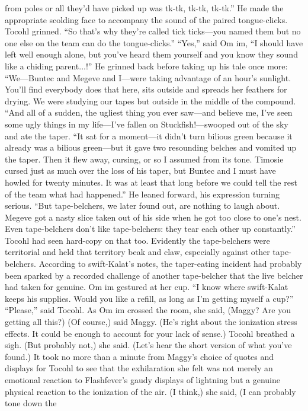 \documentclass[9pt]{article}
\begin{document}
from poles or all they’d have picked up was tk-tk, tk-tk, tk-tk.” He made the appropriate scolding face
to accompany the sound of the paired tongue-clicks.
Tocohl grinned. “So that’s why they’re called tick ticks—you named them but no one else on the
team can do the tongue-clicks.”
“Yes,” said Om im, “I should have left well enough alone, but you’ve heard them yourself and you
know they sound like a chiding parent...!”
He grinned back before taking up his tale once more: “We—Buntec and Megeve and I—were
taking advantage of an hour’s sunlight. You’ll find everybody does that here, sits outside and spreads her
feathers for drying. We were studying our tapes but outside in the middle of the compound.
“And all of a sudden, the ugliest thing you ever saw—and believe me, I’ve seen some ugly things in
my life—I’ve fallen on Stuckfish!—swooped out of the sky and ate the taper.
“It sat for a moment—it didn’t turn bilious green because it already was a bilious green—but it gave
two resounding belches and vomited up the taper. Then it flew away, cursing, or so I assumed from its
tone. Timosie cursed just as much over the loss of his taper, but Buntec and I must have howled for
twenty minutes. It was at least that long before we could tell the rest of the team what had happened.”
He leaned forward, his expression turning serious. “But tape-belchers, we later found out, are nothing
to laugh about. Megeve got a nasty slice taken out of his side when he got too close to one’s nest. Even
tape-belchers don’t like tape-belchers: they tear each other up constantly.”
Tocohl had seen hard-copy on that too. Evidently the tape-belchers were territorial and held that
territory beak and claw, especially against other tape-belchers. According to swift-Kalat’s notes, the
taper-eating incident had probably been sparked by a recorded challenge of another tape-belcher that
the live belcher had taken for genuine.
Om im gestured at her cup. “I know where swift-Kalat keeps his supplies. Would you like a refill, as
long as I’m getting myself a cup?”
“Please,” said Tocohl. As Om im crossed the room, she said, (Maggy? Are you getting all this?)
(Of course,) said Maggy. (He’s right about the ionization stress effects. It could be enough to
account for your lack of sense.)
Tocohl breathed a sigh. (But probably not,) she said. (Let’s hear the short version of what you’ve
found.)
It took no more than a minute from Maggy’s choice of quotes and displays for Tocohl to see that the
exhilaration she felt was not merely an emotional reaction to Flashfever’s gaudy displays of lightning but a
genuine physical reaction to the ionization of the air. (I think,) she said, (I can probably tone down the
\end{document}

